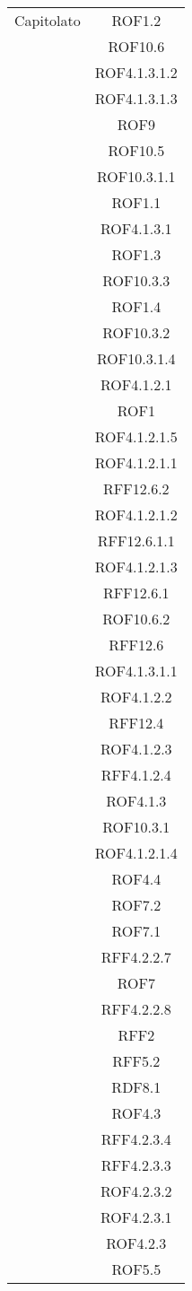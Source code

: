 \begin{longtable}{|c|c|}
\midrule
Capitolato
& ROF1.2\\
& ROF10.6\\
& ROF4.1.3.1.2\\
& ROF4.1.3.1.3\\
& ROF9\\
& ROF10.5\\
& ROF10.3.1.1\\
& ROF1.1\\
& ROF4.1.3.1\\
& ROF1.3\\
& ROF10.3.3\\
& ROF1.4\\
& ROF10.3.2\\
& ROF10.3.1.4\\
& ROF4.1.2.1\\
& ROF1\\
& ROF4.1.2.1.5\\
& ROF4.1.2.1.1\\
& RFF12.6.2\\
& ROF4.1.2.1.2\\
& RFF12.6.1.1\\
& ROF4.1.2.1.3\\
& RFF12.6.1\\
& ROF10.6.2\\
& RFF12.6\\
& ROF4.1.3.1.1\\
& ROF4.1.2.2\\
& RFF12.4\\
& ROF4.1.2.3\\
& RFF4.1.2.4\\
& ROF4.1.3\\
& ROF10.3.1\\
& ROF4.1.2.1.4\\
& ROF4.4\\
& ROF7.2\\
& ROF7.1\\
& RFF4.2.2.7\\
& ROF7\\
& RFF4.2.2.8\\
& RFF2\\
& RFF5.2\\
& RDF8.1\\
& ROF4.3\\
& RFF4.2.3.4\\
& RFF4.2.3.3\\
& ROF4.2.3.2\\
& ROF4.2.3.1\\
& ROF4.2.3\\
& ROF5.5\\

\end{longtable}
